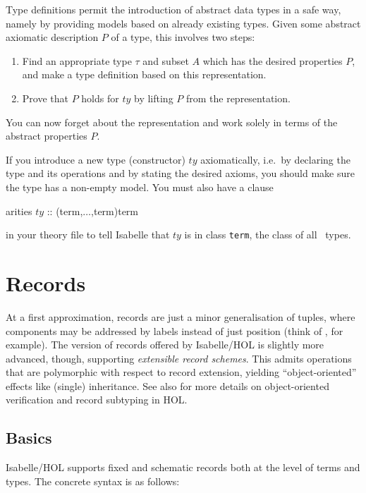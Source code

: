 Type definitions permit the introduction of abstract data types in a safe
way, namely by providing models based on already existing types.  Given some
abstract axiomatic description $P$ of a type, this involves two steps:
\begin{enumerate}
\item Find an appropriate type $\tau$ and subset $A$ which has the desired
  properties $P$, and make a type definition based on this representation.
\item Prove that $P$ holds for $ty$ by lifting $P$ from the representation.
\end{enumerate}
You can now forget about the representation and work solely in terms of the
abstract properties $P$.

\begin{warn}
If you introduce a new type (constructor) $ty$ axiomatically, i.e.\ by
declaring the type and its operations and by stating the desired axioms, you
should make sure the type has a non-empty model.  You must also have a clause
\par
\begin{ttbox}
arities \(ty\) :: (term,\thinspace\(\dots\),{\thinspace}term){\thinspace}term
\end{ttbox}
in your theory file to tell Isabelle that $ty$ is in class \texttt{term}, the
class of all \HOL\ types.
\end{warn}


\section{Records}

At a first approximation, records are just a minor generalisation of tuples,
where components may be addressed by labels instead of just position (think of
{\ML}, for example).  The version of records offered by Isabelle/HOL is
slightly more advanced, though, supporting \emph{extensible record schemes}.
This admits operations that are polymorphic with respect to record extension,
yielding ``object-oriented'' effects like (single) inheritance.  See also
\cite{NaraschewskiW-TPHOLs98} for more details on object-oriented
verification and record subtyping in HOL.


\subsection{Basics}

Isabelle/HOL supports fixed and schematic records both at the level of terms
and types.  The concrete syntax is as follows:

